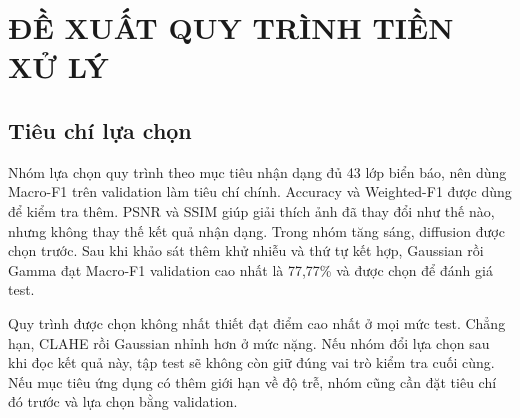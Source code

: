 \section{ĐỀ XUẤT QUY TRÌNH TIỀN XỬ LÝ}
\subsection{Tiêu chí lựa chọn}
Nhóm lựa chọn quy trình theo mục tiêu nhận dạng đủ 43 lớp biển báo, nên dùng Macro-F1 trên validation làm tiêu chí chính. Accuracy và Weighted-F1 được dùng để kiểm tra thêm. PSNR và SSIM giúp giải thích ảnh đã thay đổi như thế nào, nhưng không thay thế kết quả nhận dạng. Trong nhóm tăng sáng, diffusion được chọn trước. Sau khi khảo sát thêm khử nhiễu và thứ tự kết hợp, Gaussian rồi Gamma đạt Macro-F1 validation cao nhất là 77,77\% và được chọn để đánh giá test.

Quy trình được chọn không nhất thiết đạt điểm cao nhất ở mọi mức test. Chẳng hạn, CLAHE rồi Gaussian nhỉnh hơn ở mức nặng. Nếu nhóm đổi lựa chọn sau khi đọc kết quả này, tập test sẽ không còn giữ đúng vai trò kiểm tra cuối cùng. Nếu mục tiêu ứng dụng có thêm giới hạn về độ trễ, nhóm cũng cần đặt tiêu chí đó trước và lựa chọn bằng validation.

